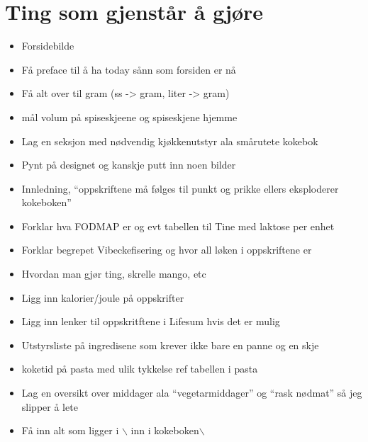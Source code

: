 
\chapter*{Ting som gjenstår å gjøre}
\begin{itemize}[noitemsep]
  \item Forsidebilde
  \item Få preface til å ha today sånn som forsiden er nå
  \item Få alt over til gram (ss -> gram, liter -> gram)
  \item mål volum på spiseskjeene og spiseskjene hjemme
  \item Lag en seksjon med nødvendig kjøkkenutstyr ala smårutete kokebok
  \item Pynt på designet og kanskje putt inn noen bilder
  \item Innledning, ``oppskriftene må følges til punkt og prikke ellers eksploderer kokeboken''
  \item Forklar hva FODMAP er og evt tabellen til Tine med laktose per enhet
  \item Forklar begrepet Vibeckefisering og hvor all løken i oppskriftene er
  \item Hvordan man gjør ting, skrelle mango, etc
  \item Ligg inn kalorier/joule på oppskrifter
  \item Ligg inn lenker til oppskritftene i Lifesum hvis det er mulig
  \item Utstyrsliste på ingredisene som krever ikke bare en panne og en skje
  \item koketid på pasta med ulik tykkelse ref tabellen i pasta
  \item Lag en oversikt over middager ala ``vegetarmiddager'' og ``rask nødmat'' så jeg slipper å lete
  \item Få inn alt som ligger i  $\backslash{}$ inn i kokeboken$\backslash{}$
\end{itemize}
